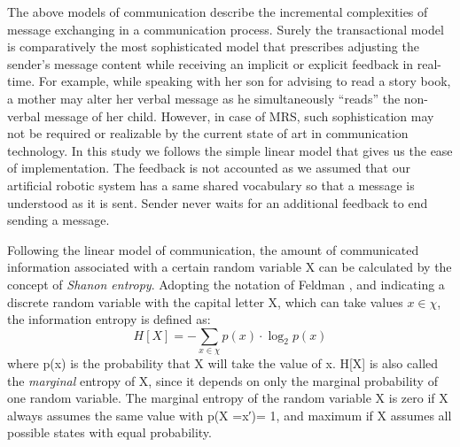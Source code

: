 The above models of communication describe the incremental complexities of message exchanging in a communication process. Surely the transactional model is comparatively the most sophisticated model that prescribes adjusting the sender's message content while receiving an implicit or explicit feedback in real-time. For example, while speaking with her son for advising to read a story book, a mother may alter her verbal message as he simultaneously ``reads'' the non-verbal message of her child. However, in case of MRS, such sophistication may not be required or realizable by the current state of art in communication technology. In this study we follows the simple linear model that gives us the ease of implementation. The feedback is not accounted as we assumed that our artificial robotic system has a same shared vocabulary so that a message is understood as it is sent. Sender never waits for an additional feedback to end sending a message. 

Following the linear model of communication, the amount of communicated information associated with a certain random variable X can be calculated by the concept of {\em Shanon entropy}. Adopting the notation of Feldman \cite{Feldman1997}, and indicating a discrete random variable with the capital letter X, which can take values $x \in \chi$, the information entropy is defined as:
\begin{equation}
\label{eq:entropy}
H[X] = - \sum_{x \in \chi } p(x) \cdot  \log_{2} p(x)
\end{equation}
where p(x) is the probability that X will take the value of x. H[X] is also called the {\em marginal} entropy of X, since it depends on only the marginal probability of one random variable. The marginal entropy of the random variable X is zero if X always assumes the same value with p(X =x′)= 1, and maximum if X assumes all possible states with equal probability.


